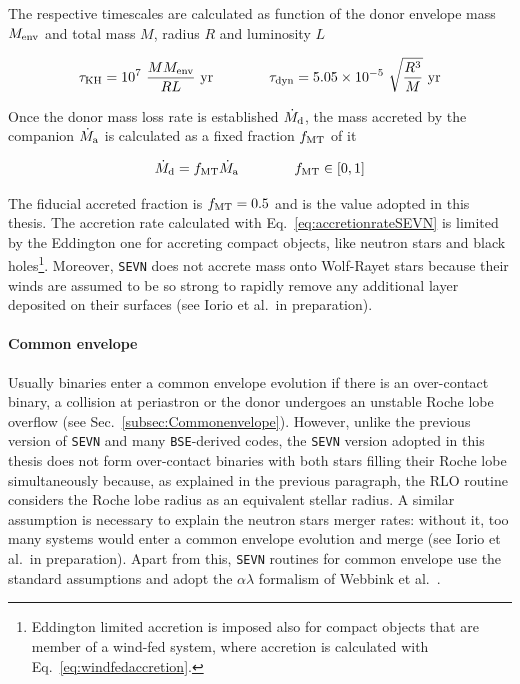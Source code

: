 \documentclass[a4paper,titlepage]{book}     	%
\newcommand{\mdot}{\ensuremath{\dot{M}}}
\newcommand{\yr}{\text{yr}}
\begin{document}
The respective timescales are calculated as function of the donor envelope mass $M_{\rm env}$ and total mass $M$, radius $R$ and luminosity $L$

\begin{equation}
    \tau_{\rm KH} = 10^7 ~\frac{M M_{\rm env}}{RL}~\yr \qquad \qquad \tau_{\rm dyn} = 5.05 \times 10^{-5}~ \sqrt{\frac{R^3}{M}}~\yr
\end{equation}

Once the donor mass loss rate is established $\mdot_{\rm d}$, the mass accreted by the companion $\mdot_{\rm a}$ is calculated as a fixed fraction $f_{\rm MT}$ of it

\begin{equation}\label{eq:accretionrateSEVN}
    \mdot_{\rm d} = f_{\rm MT} \mdot_{\rm a} \qquad \qquad f_{\rm MT} \in [0,1]
\end{equation}

The fiducial accreted fraction is $f_{\rm MT} = 0.5$ and is the value adopted in this thesis. The accretion rate calculated with Eq.\ \ref{eq:accretionrateSEVN} is limited by the Eddington one for accreting compact objects, like neutron stars and black holes\footnote{Eddington limited accretion is imposed also for compact objects that are member of a wind-fed system, where accretion is calculated with Eq.\ \ref{eq:windfedaccretion}.}. Moreover, \texttt{SEVN} does not accrete mass onto Wolf-Rayet stars because their winds are assumed to be so strong to rapidly remove any additional layer deposited on their surfaces (see Iorio et al.\ in preparation).




\paragraph{Common envelope} Usually binaries enter a common envelope evolution if there is an over-contact binary, a collision at periastron or the donor undergoes an unstable Roche lobe overflow (see Sec.\ \ref{subsec:Commonenvelope}). However, unlike the previous version of \texttt{SEVN} \cite{spera2019_mergingBBH} and many \texttt{BSE}-derived codes, the \texttt{SEVN} version adopted in this thesis does not form over-contact binaries with both stars filling their Roche lobe simultaneously because, as explained in the previous paragraph, the RLO routine considers the Roche lobe radius as an equivalent stellar radius. A similar assumption is necessary to explain the neutron stars merger rates: without it, too many systems would enter a common envelope evolution and merge (see Iorio et al.\ in preparation). Apart from this, \texttt{SEVN} routines for common envelope use the standard assumptions and adopt the $\alpha \lambda$ formalism of Webbink et al.\ \cite{Webbink1984_CE}. \\
\end{document}
